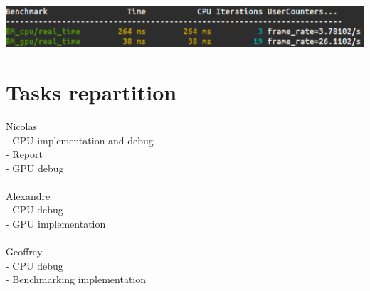 \documentclass{article}
\begin{document}
\begin{center}
    \includegraphics[width=1\textwidth]{pics/benchmark02.png}
\end{center}


\section{Tasks repartition}

\noindent
Nicolas\\
- CPU implementation and debug\\
- Report\\
- GPU debug\\
\\
Alexandre\\
- CPU debug\\
- GPU implementation\\
\\
Geoffrey\\
- CPU debug\\
- Benchmarking implementation
\end{document}
